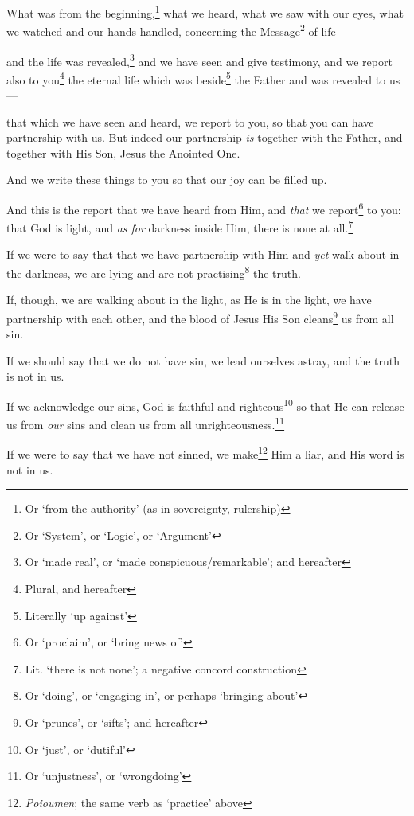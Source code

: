 \documentclass[article]{memoir}%
\newcounter{vnum}
\renewcommand*{\chapter}{
	\vspace{\baselineskip}
	\settowidth{\chapindent}{\chapnumfont 999}
	\noindent\llap{\makebox[\chapindent][l]{%
		\chapnumfont \thechapter}}%
	\addtocounter{chapter}{1}
	\setcounter{vnum}{1}
}
\newcommand{\vnum}{%
	\textsuperscript{\thevnum}%
	\addtocounter{vnum}{1}%
}
\newcommand{\infer}[1]{\textit{#1}}
\newcommand{\focus}[1]{{#1}}
\renewcommand*{\book}[1]{%
	\makebox[\textwidth][c]{\centering \booktitlefont #1}%
}
\begin{document}
\book{1 John}
	
\chapter{} \vnum What was from the beginning,\footnote{Or ‘from the authority’ (as in sovereignty, rulership)} what we heard, what we saw with our eyes, what we watched and our hands handled, concerning the Message\footnote{Or ‘System’, or ‘Logic’, or ‘Argument’} of life---\vnum and the life was revealed,\footnote{Or `made real', or `made conspicuous/remarkable'; and hereafter} and we have seen and give testimony, and we report also to you\footnote{Plural, and hereafter} the eternal life which was beside\footnote{Literally ‘up against’} the Father and was revealed to us---\vnum that which we have seen and heard, we report to you, so that you can have partnership with us. But indeed our partnership \infer{is} together with the Father, and together with His Son, Jesus the Anointed One. \vnum And we write these things to you so that our joy can be filled up.

\vnum And \focus{this} is the report that we have heard from Him, and \infer{that} we report\footnote{Or `proclaim', or `bring news of'} to you: that God is light, and \infer{as for} darkness inside Him, there is none at all.\footnote{Lit. `there is not none'; a negative concord construction} \vnum If we were to say that that we have partnership with Him and \infer{yet} walk about in the darkness, we are lying and are not practising\footnote{Or `doing', or `engaging in', or perhaps `bringing about'} the truth. \vnum If, though, we are walking about in the light, as He is in the light, we have partnership with each other, and the blood of Jesus His Son cleans\footnote{Or `prunes', or `sifts'; and hereafter} us from all sin. \vnum If we should say that we do not have sin, we lead ourselves astray, and the truth is not in us. \vnum If we acknowledge our sins, God is faithful and righteous\footnote{Or `just', or `dutiful'} so that He can release us from \infer{our} sins and clean us from all unrighteousness.\footnote{Or `unjustness', or `wrongdoing'} \vnum If we were to say that we have not sinned, we make\footnote{\textit{Poioumen}; the same verb as `practice' above} Him a liar, and His word is not in us.
\end{document}
